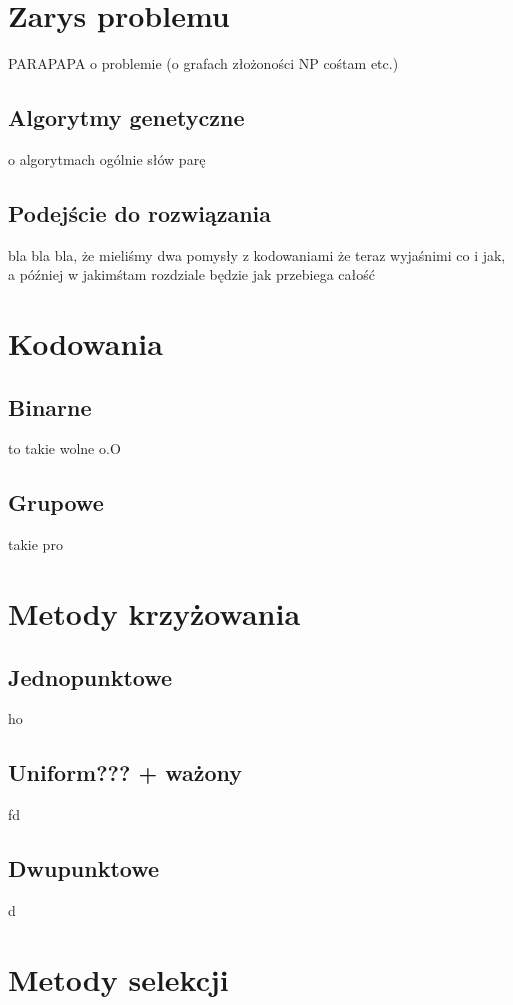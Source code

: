 \documentclass[11pt]{aghdpl}
\author{Wojciech Kasperek, Krzysztof Spytkowski, Izabela Śmietana}
\date{2014}
\begin{document}
\titlepages

\tableofcontents
\clearpage

\chapter{Zarys problemu}
\label{cha:wprowadzenie}
PARAPAPA o problemie (o grafach złożoności NP cośtam etc.)
\section{Algorytmy genetyczne}
\label{sec:algGenetyczne}
o algorytmach ogólnie słów parę
\section{Podejście do rozwiązania}
\label{sec:podejscie}
bla bla bla, że mieliśmy dwa pomysły z kodowaniami
że teraz wyjaśnimi co i jak, a później w jakimśtam rozdziale będzie jak przebiega całość

\chapter{Kodowania}
\label{cha:encoding}
\section{Binarne}
\label{sec:binary}
to takie wolne o.O
\section{Grupowe}
\label{sec:group}
takie pro

\chapter{Metody krzyżowania}
\label{cha:crossing}
\section{Jednopunktowe}
\label{sec:singlePoint}
ho
\section{Uniform??? + ważony}
\label{sec:uniform}
fd
\section{Dwupunktowe}
\label{sec:twoPoints}
d

\chapter{Metody selekcji}
\label{cha:selection}
\end{document}
